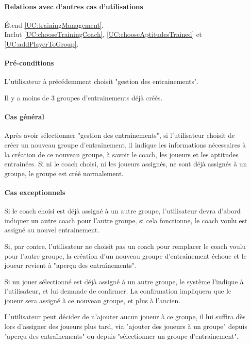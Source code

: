 \paragraph{Relations avec d'autres cas d'utilisations}
Étend \ref{UC:trainingManagement}.\\
Inclut \ref{UC:chooseTrainingCoach}, \ref{UC:chooseAptitudesTrained} et \ref{UC:addPlayerToGroup}.
\paragraph{Pré-conditions}
\begin{list}{}{\leftmargin=1.5em}
\item{L'utilisateur à précédemment choisit "gestion des entrainements".}
\item{Il y a moins de 3 groupes d'entrainements déjà créés.}
\end{list}
\paragraph{Cas général}
Après avoir sélectionner "gestion des entrainements", si l'utilisateur choisit de créer un nouveau groupe d'entrainement, il indique les informations nécessaires à la création de ce nouveau groupe, à savoir le coach, les joueurs et les aptitudes entrainées. Si ni le coach choisi, ni les joueurs assignés, ne sont déjà assignés à un groupe, le groupe est créé normalement.
\paragraph{Cas exceptionnels}
\begin{list}{}{\leftmargin=1.5em}
\item{Si le coach choisi est déjà assigné à un autre groupe, l'utilisateur devra d'abord indiquer un autre coach pour l'autre groupe, si cela fonctionne, le coach voulu est assigné au nouvel entrainement. }
\item{Si, par contre, l'utilisateur ne choisit pas un coach pour remplacer le coach voulu pour l'autre groupe, la création d'un nouveau groupe d'entrainement échoue et le joueur revient à "aperçu des entraînements". }
\item{Si un jouer sélectionné est déjà assigné à un autre groupe, le système l'indique à l'utilisateur, et lui demande de confirmer. La confirmation impliquera que le joueur sera assigné à ce nouveau groupe, et plus à l'ancien. }
\item{L'utilisateur peut décider de n'ajouter aucun joueur à ce groupe, il lui suffira dès lors d'assigner des joueurs plus tard, via "ajouter des joueurs à un groupe" depuis "aperçu des entraînements" ou depuis "sélectionner un groupe d'entrainement". }
\end{list}
